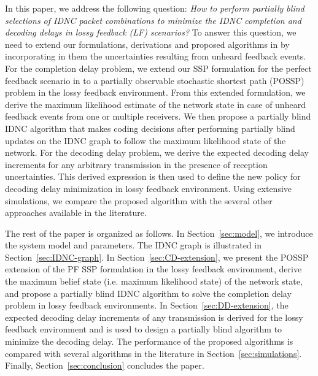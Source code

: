 \documentclass[10pt,jounral]{IEEEtran}
\newcommand{\sref}[1]{Section~\ref{#1}}
\newcommand{\ignore}[1]{}
\begin{document}
In this paper, we address the following question: \emph{How to perform partially blind selections of IDNC packet combinations to minimize the IDNC completion and decoding delays in lossy feedback (LF) scenarios?} To answer this question, we need to extend our formulations, derivations and proposed algorithms in \cite{ICC10,TON10-CD,GC10} by incorporating in them the uncertainties resulting from unheard feedback events. For the completion delay problem, we extend our SSP formulation for the perfect feedback scenario in \cite{TON10-CD} to a partially observable stochastic shortest path (POSSP) problem \cite{Patek99onpartially} in the lossy feedback environment. From this extended formulation, we derive the maximum likelihood estimate of the network state in case of unheard feedback events from one or multiple receivers. We then propose a partially blind IDNC algorithm that makes coding decisions\ignore{ as in \cite{TON10-CD},} after performing partially blind updates on the IDNC graph to follow the maximum likelihood state of the network. For the decoding delay problem, we derive the expected decoding delay increments for any arbitrary transmission in the presence of reception uncertainties. This derived expression is then used to define the new policy for decoding delay minimization in lossy feedback environment. Using extensive simulations, we compare the proposed algorithm with the several other approaches available in the literature.

The rest of the paper is organized as follows. In \sref{sec:model}, we introduce the system model
and parameters. The IDNC graph is illustrated in \sref{sec:IDNC-graph}. In \sref{sec:CD-extension}, we present the POSSP extension of the PF SSP formulation in the lossy feedback environment, derive the maximum belief state (i.e. maximum likelihood state) of the network state, and propose a partially blind IDNC algorithm to solve the completion delay problem in lossy feedback environments. In \sref{sec:DD-extension}, the expected decoding delay increments of any transmission is derived for the lossy feedback environment and is used to design a partially blind algorithm to minimize the decoding delay. The performance of the proposed algorithms is compared with several algorithms in the literature in \sref{sec:simulations}. Finally, \sref{sec:conclusion} concludes the paper.
\end{document}
